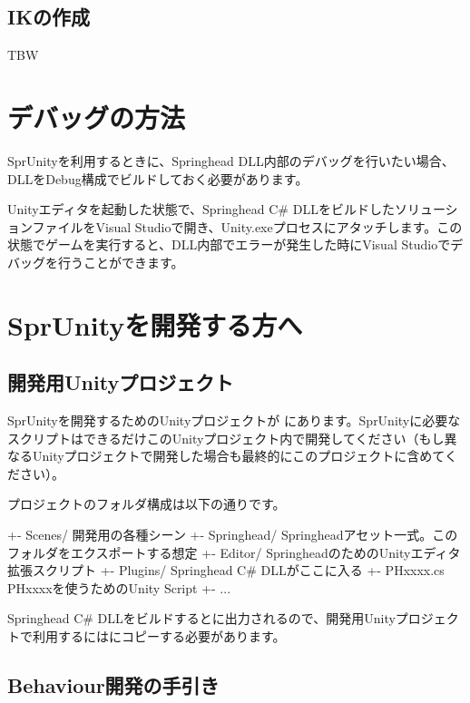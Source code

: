\subsection{IKの作成}

TBW



\section{デバッグの方法}

SprUnityを利用するときに、Springhead DLL内部のデバッグを行いたい場合、DLLをDebug構成でビルドしておく必要があります。

Unityエディタを起動した状態で、Springhead C\# DLLをビルドしたソリューションファイルをVisual Studioで開き、Unity.exeプロセスにアタッチします。この状態でゲームを実行すると、DLL内部でエラーが発生した時にVisual Studioでデバッグを行うことができます。



\section{SprUnityを開発する方へ}

\subsection{開発用Unityプロジェクト}

SprUnityを開発するためのUnityプロジェクトが  にあります。SprUnityに必要なスクリプトはできるだけこのUnityプロジェクト内で開発してください（もし異なるUnityプロジェクトで開発した場合も最終的にこのプロジェクトに含めてください）。

\KLUDGE プロジェクトのフォルダ構成は以下の通りです。
\begin{sourcecode}
\KLUDGE +- Scenes/         開発用の各種シーン
\KLUDGE +- Springhead/     Springheadアセット一式。このフォルダをエクスポートする想定
\KLUDGE    +- Editor/      SpringheadのためのUnityエディタ拡張スクリプト
\KLUDGE    +- Plugins/     Springhead C# DLLがここに入る
\KLUDGE    +- PHxxxx.cs    PHxxxxを使うためのUnity Script
\KLUDGE    +- ...
\end{sourcecode}

Springhead C\# DLLをビルドするとに出力されるので、開発用Unityプロジェクトで利用するにはにコピーする必要があります。


\subsection{Behaviour開発の手引き}

